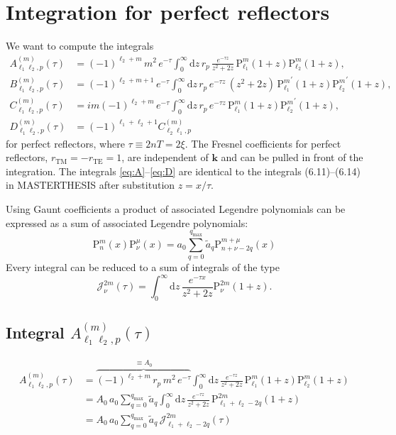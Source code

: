 \documentclass[10pt]{article}
\newcommand{\imag}{i} %
\newcommand{\e}{e}    %
\newcommand{\TE}{\mathrm{TE}}
\newcommand{\TM}{\mathrm{TM}}
\newcommand{\Plm}[2]{{\text{P}_{#1}^{#2}}}
\newcommand{\qmax}{{q_\text{max}}}
\renewcommand{\vec}[1]{{\mathbf{#1}}}
\begin{document}
\section{Integration for perfect reflectors}

We want to compute the integrals
\begin{align}
\label{eq:A}
A_{\ell_1\ell_2,p}^{(m)}(\tau) &= (-1)^{\ell_2+m} \, m^2 \, \e^{-\tau} \int_0^\infty \mathrm{d}z \, r_p \, \frac{\e^{-\tau z}}{z^2+2z} \, \Plm{\ell_1}{m}(1+z) \Plm{\ell_2}{m}(1+z), \\
\label{eq:B}
B_{\ell_1\ell_2,p}^{(m)}(\tau) &= (-1)^{\ell_2+m+1} \, \e^{-\tau} \int_0^\infty \mathrm{d}z \, r_p \, \e^{-\tau z} \, (z^2+2z) \, \Plm{\ell_1}{m}^\prime(1+z) \Plm{\ell_2}{m}^\prime(1+z), \\
\label{eq:C}
C_{\ell_1\ell_2,p}^{(m)}(\tau) &= \imag m (-1)^{\ell_2+m} \, \e^{-\tau} \int_0^\infty \mathrm{d}z \, r_p \, \e^{-\tau z} \, \Plm{\ell_1}{m}(1+z) \Plm{\ell_2}{m}^\prime(1+z), \\
\label{eq:D}
D_{\ell_1\ell_2,p}^{(m)}(\tau) &= (-1)^{\ell_1+\ell_2+1} C_{\ell_2\ell_1,p}^{(m)}
\end{align}
for perfect reflectors, where $\tau \equiv 2nT=2\xi$. The Fresnel coefficients
for perfect reflectors, $r_\TM=-r_\TE=1$, are independent of $\vec k$ and
can be pulled in front of the integration. The integrals \eqref{eq:A}--\eqref{eq:D}
are identical to the integrals (6.11)--(6.14) in MASTERTHESIS after substitution $z = x/\tau$.

Using Gaunt coefficients a product of associated Legendre polynomials can be
expressed as a sum of associated Legendre polynomials:
\begin{equation}
\Plm{n}{m}(x) \Plm{\nu}{\mu}(x) = a_0 \sum_{q=0}^\qmax \tilde a_q  \Plm{n+\nu-2q}{m+\mu}(x)
\end{equation}
Every integral can be reduced to a sum of integrals of the type
\begin{equation}
\mathcal{J}_\nu^{2m}(\tau) = \int_0^\infty \mathrm{d}z \, \frac{\e^{-\tau x}}{z^2+2z} \Plm{\nu}{2m}\left(1+z\right).
\end{equation}


\subsection{Integral $A_{\ell_1\ell_2,p}^{(m)}(\tau)$}

\begin{align}
\nonumber
A_{\ell_1\ell_2,p}^{(m)}(\tau) &= \overbrace{(-1)^{\ell_2+m} \, r_p \, m^2 \, \e^{-\tau}}^{\equiv A_0} \int_0^\infty \mathrm{d}z \, \frac{\e^{-\tau z}}{z^2+2z} \, \Plm{\ell_1}{m}(1+z) \Plm{\ell_2}{m}(1+z) \\
\nonumber
&= A_0 \, a_0 \sum_{q=0}^\qmax \tilde a_q \int_0^\infty \mathrm{d}z \, \frac{\e^{-\tau z}}{z^2+2z} \, \Plm{\ell_1+\ell_2-2q}{2m}(1+z) \\
&= A_0 \, a_0 \sum_{q=0}^\qmax \tilde a_q \, \mathcal{J}_{\ell_1+\ell_2-2q}^{2m}(\tau)
\end{align}
\end{document}
